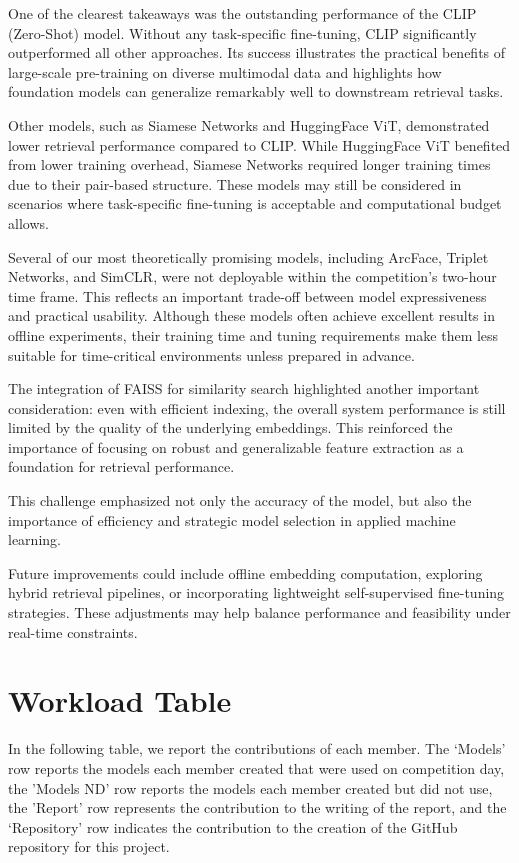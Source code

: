 \documentclass[10pt,twocolumn,letterpaper]{article}
\begin{document}
One of the clearest takeaways was the outstanding performance of the CLIP (Zero-Shot) model. Without any task-specific fine-tuning, CLIP significantly outperformed all other approaches. Its success illustrates the practical benefits of large-scale pre-training on diverse multimodal data and highlights how foundation models can generalize remarkably well to downstream retrieval tasks.

Other models, such as Siamese Networks and HuggingFace ViT, demonstrated lower retrieval performance compared to CLIP. While HuggingFace ViT benefited from lower training overhead, Siamese Networks required longer training times due to their pair-based structure. These models may still be considered in scenarios where task-specific fine-tuning is acceptable and computational budget allows.

Several of our most theoretically promising models, including ArcFace, Triplet Networks, and SimCLR, were not deployable within the competition's two-hour time frame. This reflects an important trade-off between model expressiveness and practical usability. Although these models often achieve excellent results in offline experiments, their training time and tuning requirements make them less suitable for time-critical environments unless prepared in advance.

The integration of FAISS for similarity search highlighted another important consideration: even with efficient indexing, the overall system performance is still limited by the quality of the underlying embeddings. This reinforced the importance of focusing on robust and generalizable feature extraction as a foundation for retrieval performance.

This challenge emphasized not only the accuracy of the model, but also the importance of efficiency and strategic model selection in applied machine learning.

Future improvements could include offline embedding computation, exploring hybrid retrieval pipelines, or incorporating lightweight self-supervised fine-tuning strategies. These adjustments may help balance performance and feasibility under real-time constraints.

\section{Workload Table}
In the following table, we report the contributions of each member. The ‘Models’ row reports the models each member created that were used on competition day, the 'Models ND' row reports the models each member created but did not use, the 'Report' row represents the contribution to the writing of the report, and the ‘Repository’ row indicates the contribution to the creation of the GitHub repository for this project.
\end{document}

